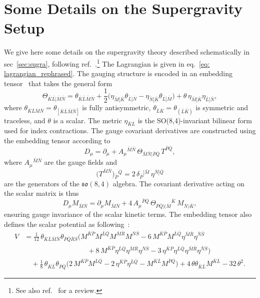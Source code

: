 \documentclass[11pt,a4paper]{article}
\newcommand{\bK}{{\bar{K}}}
\newcommand{\bL}{{\bar{L}}}
\newcommand{\bM}{{\bar{M}}}
\newcommand{\bN}{{\bar{N}}}
\newcommand{\bP}{{\bar{P}}}
\newcommand{\bQ}{{\bar{Q}}}
\newcommand{\bR}{{\bar{R}}}
\newcommand{\bS}{{\bar{S}}}
\begin{document}
\appendix
\section{Some Details on the Supergravity Setup} \label{app:sugra}
We give here some details on the supergravity theory described schematically in sec~\ref{sec:sugra}, following ref.~\cite{Nicolai:2001ac,deWit:2003ja}.\footnote{See also ref.~\cite{Eloy:2021qol} for a review.} The Lagrangian is given in eq.~\eqref{eq: lagrangian_rephrased}. The gauging structure is encoded in an embedding tensor~\cite{Nicolai:2000sc,deWit:2002vt} that takes the general form
%
\begin{equation}	\label{eq: embtensor_rephrased}
	\Theta_{\bK\bL\vert\bM\bN}=\theta_{\bK\bL\bM\bN}+\frac12\Big(\eta_{\bM[\bK}\theta_{\bL]\bN}-\eta_{\bN[\bK}\theta_{\bL]\bM}\Big)+\theta\,\eta_{\bM[\bK}\eta_{\bL]\bN},
\end{equation}
%
where $\theta_{\bK\bL\bM\bN}=\theta_{[\bK\bL\bM\bN]}$ is fully antisymmetric, $\theta_{\bL\bK}=\theta_{(\bL\bK)}$ is symmetric and traceless, and $\theta$ is a scalar. The metric $\eta_{\bK\bL}$ is the SO(8,4)-invariant bilinear form used for index contractions. The gauge covariant derivatives are constructed using the embedding tensor according to
%
\begin{equation}
	D_\mu =\partial_\mu + A_\mu{}^{\bM\bN}\,\Theta_{\bM\bN\vert\bP\bQ}\, T^{\bP\bQ},
\end{equation}
%
where $A_\mu{}^{\bM\bN}$ are the gauge fields and
%
\begin{equation} \label{eq:so84gen_rephrased}
	\big(T^{\bar M\bar N}\big){}_{\bar P}{}^{\bar Q} = 2\,\delta_{\bar P}{}^{[\bar M}\,\eta^{\bar N]\bar Q}
\end{equation}
%
are the generators of the $\mathfrak{so}(8,4)$ algebra. The covariant derivative acting on the scalar matrix is thus
%
\begin{equation}
	D_\mu M_{\bM\bN}=\partial_\mu M_{\bM\bN}+4\,A_\mu{}^{\bP\bQ}\,\Theta_{\bP\bQ\vert(\bM}{}^{\bK}\, M_{\bN)\bK},
\end{equation}
%
ensuring gauge invariance of the scalar kinetic terms. The embedding tensor also defines the scalar potential as following~\cite{Samtleben:2019zrh,Schon:2006kz}:
%
{\setlength\arraycolsep{1.2pt}
	\begin{equation}	\label{eq: scalarpot_rephrased}
		\begin{aligned}
			V	&=	\frac1{12}\,\theta_{\bK\bL\bM\bN}\theta_{\bP\bQ\bR\bS}\Big(M^{\bK\bP}M^{\bL\bQ}M^{\bM\bR}M^{\bN\bS}-6\,M^{\bK\bP}M^{\bL\bQ}\eta^{\bM\bR}\eta^{\bN\bS}\\
			&\qquad\qquad\qquad\qquad\quad+8\,M^{\bK\bP}\eta^{\bL\bQ}\eta^{\bM\bR}\eta^{\bN\bS}-3\,\eta^{\bK\bP}\eta^{\bL\bQ}\eta^{\bM\bR}\eta^{\bN\bS}\Big)\\
			&\quad +\frac1{8}\,\theta_{\bK\bL}\theta_{\bP\bQ}\Big(2\,M^{\bK\bP}M^{\bL\bQ}-2\,\eta^{\bK\bP}\eta^{\bL\bQ}-M^{\bK\bL}M^{\bP\bQ}\Big)+4\,\theta\theta_{\bK\bL}M^{\bK\bL}-32\,\theta^2.
		\end{aligned}
	\end{equation}
}
\end{document}
